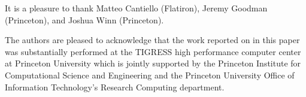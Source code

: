 \documentclass[modern, letterpaper]{aastex62}
\newcommand{\apogee}{\project{\acronym{APOGEE}}}
\newcommand{\sdssiv}{\project{\acronym{SDSS-IV}}}
\begin{document}
It is a pleasure to thank
Matteo Cantiello (Flatiron),
Jeremy Goodman (Princeton),
and Joshua Winn (Princeton).

The authors are pleased to acknowledge that the work reported on in this
paper was substantially performed at the TIGRESS high performance computer
center at Princeton University which is jointly supported by the Princeton
Institute for Computational Science and Engineering and the Princeton
University Office of Information Technology's Research Computing department.


\facility{\sdssiv, \apogee}

\clearpage



\end{document}
